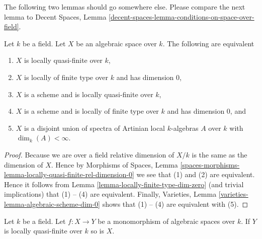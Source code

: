 \noindent
The following two lemmas should go somewhere else.
Please compare the next lemma to
Decent Spaces, Lemma \ref{decent-spaces-lemma-conditions-on-space-over-field}.

\begin{lemma}
\label{lemma-locally-quasi-finite-over-field}
Let $k$ be a field. Let $X$ be an algebraic space over $k$.
The following are equivalent
\begin{enumerate}
\item $X$ is locally quasi-finite over $k$,
\item $X$ is locally of finite type over $k$ and has dimension $0$,
\item $X$ is a scheme and is locally quasi-finite over $k$,
\item $X$ is a scheme and is locally of finite type over $k$ and has
dimension $0$, and
\item $X$ is a disjoint union of spectra of Artinian local $k$-algebras
$A$ over $k$ with $\dim_k(A) < \infty$.
\end{enumerate}
\end{lemma}

\begin{proof}
Because we are over a field relative dimension of $X/k$ is the same as
the dimension of $X$. Hence by
Morphisms of Spaces,
Lemma \ref{spaces-morphisms-lemma-locally-quasi-finite-rel-dimension-0}
we see that (1) and (2) are equivalent. Hence it follows from
Lemma \ref{lemma-locally-finite-type-dim-zero}
(and trivial implications) that (1) -- (4) are equivalent.
Finally,
Varieties, Lemma \ref{varieties-lemma-algebraic-scheme-dim-0}
shows that (1) -- (4) are equivalent with (5).
\end{proof}

\begin{lemma}
\label{lemma-mono-towards-locally-quasi-finite-over-field}
Let $k$ be a field. Let $f : X \to Y$ be a monomorphism of algebraic spaces
over $k$. If $Y$ is locally quasi-finite over $k$ so is $X$.
\end{lemma}

